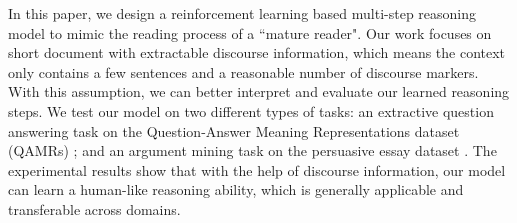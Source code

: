 




In this paper, we design a reinforcement learning based multi-step reasoning model to mimic the reading process of a ``mature reader". Our work focuses on short document with extractable discourse information, which means the context only contains a few sentences and a reasonable number of discourse markers. With this assumption, we can better interpret and evaluate our learned reasoning steps. %
We test our model on two different types of tasks: an extractive question answering task on the Question-Answer Meaning Representations dataset (QAMRs) \cite{DBLP:conf/naacl/MichaelSHDZ18}; and an argument mining task \cite{DBLP:conf/lrec/ReedPRM08}  on the persuasive essay dataset \cite{DBLP:conf/coling/StabG14}. The experimental results show that with the help of discourse information, our model can learn a human-like reasoning ability, which is generally applicable and transferable across domains.
